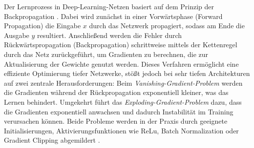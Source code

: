 Der Lernprozess in Deep-Learning-Netzen basiert auf dem Prinzip der Backpropagation \cite{Goodfellow-et-al-2016}. Dabei wird zunächst in einer Vorwärtsphase (Forward Propagation) die Eingabe $x$ durch das Netzwerk propagiert, sodass am Ende die Ausgabe $y$ resultiert. Anschließend werden die Fehler durch Rückwärtspropagation (Backpropagation) schrittweise mittels der Kettenregel durch das Netz zurückgeführt, um Gradienten zu berechnen, die zur Aktualisierung der Gewichte genutzt werden. Dieses Verfahren ermöglicht eine effiziente Optimierung tiefer Netzwerke, stößt jedoch bei sehr tiefen Architekturen auf zwei zentrale Herausforderungen: Beim \textit{Vanishing-Gradient-Problem} werden die Gradienten während der Rückpropagation exponentiell kleiner, was das Lernen behindert. Umgekehrt führt das \textit{Exploding-Gradient-Problem} dazu, dass die Gradienten exponentiell anwachsen und dadurch Instabilität im Training verursachen können. Beide Probleme werden in der Praxis durch geeignete Initialisierungen, Aktivierungsfunktionen wie \acrshort{ReLu}, Batch Normalization oder Gradient Clipping abgemildert \cite{Alzubaidi2021}.






